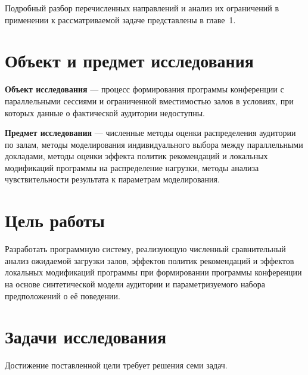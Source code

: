 Подробный разбор перечисленных направлений и анализ их ограничений в применении к рассматриваемой задаче представлены в главе~1.


\section*{Объект и предмет исследования}

\textbf{Объект исследования} — процесс формирования программы конференции с параллельными сессиями и ограниченной вместимостью залов в условиях, при которых данные о фактической аудитории недоступны.

\textbf{Предмет исследования} — численные методы оценки распределения аудитории по залам, методы моделирования индивидуального выбора между параллельными докладами, методы оценки эффекта политик рекомендаций и локальных модификаций программы на распределение нагрузки, методы анализа чувствительности результата к параметрам моделирования.


\section*{Цель работы}

Разработать программную систему, реализующую численный сравнительный анализ ожидаемой загрузки залов, эффектов политик рекомендаций и эффектов локальных модификаций программы при формировании программы конференции на основе синтетической модели аудитории и параметризуемого набора предположений о её поведении.


\section*{Задачи исследования}

Достижение поставленной цели требует решения семи задач.

